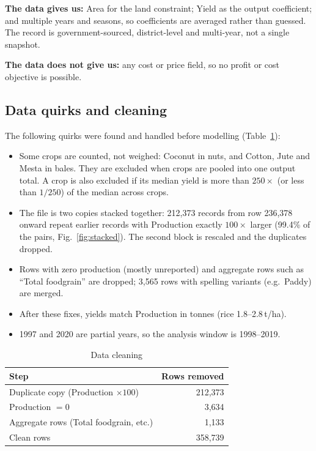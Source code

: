 \documentclass[conference]{IEEEtran}
\begin{document}
\textbf{The data gives us:} Area for the land constraint; Yield as the output coefficient; and
multiple years and seasons, so coefficients are averaged rather than guessed. The record is
government-sourced, district-level and multi-year, not a single snapshot.

\textbf{The data does not give us:} any cost or price field, so no profit or cost objective is
possible.

\subsection{Data quirks and cleaning}
The following quirks were found and handled before modelling (Table~\ref{tab:clean}):
\begin{itemize}
  \item Some crops are counted, not weighed: Coconut in nuts, and Cotton, Jute and Mesta in
        bales. They are excluded when crops are pooled into one output total. A crop is also
        excluded if its median yield is more than $250\times$ (or less than $1/250$) of the
        median across crops.
  \item The file is two copies stacked together: 212{,}373 records from row 236{,}378 onward
        repeat earlier records with Production exactly $100\times$ larger (99.4\% of the pairs,
        Fig.~\ref{fig:stacked}). The second block is rescaled and the duplicates dropped.
  \item Rows with zero production (mostly unreported) and aggregate rows such as ``Total
        foodgrain'' are dropped; 3{,}565 rows with spelling variants (e.g.\ Paddy) are merged.
  \item After these fixes, yields match Production in tonnes (rice 1.8--2.8\,t/ha).
  \item 1997 and 2020 are partial years, so the analysis window is 1998--2019.
\end{itemize}

\begin{table}[!t]
\centering
\caption{Data cleaning}\label{tab:clean}
\begin{tabular}{@{}lr@{}}
\toprule
Step & Rows removed\\
\midrule
Duplicate copy (Production $\times100$) & 212{,}373\\
Production $=0$ & 3{,}634\\
Aggregate rows (Total foodgrain, etc.) & 1{,}133\\
\midrule
Clean rows & 358{,}739\\
\bottomrule
\end{tabular}
\end{table}
\end{document}
